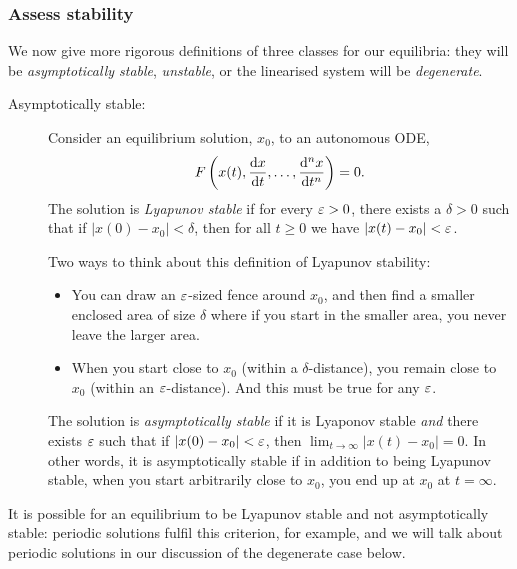 \documentclass[main.tex]{subfiles}
\begin{document}
\subsubsection*{\StepFour Assess stability}
We now give more rigorous definitions of three classes for our equilibria: they will be \emph{asymptotically stable}, \emph{unstable}, or the linearised system will be \emph{degenerate}.
\begin{description}
	\item[Asymptotically stable:]
    Consider an equilibrium solution, $x_0$, to an autonomous ODE,
    \begin{equation}
    \label{nonlin}
    F\left(x(t),\fd{x}{t},\dots,\fdn{n}{x}{t}\right) = 0.
    \end{equation}
    The solution is \emph{Lyapunov stable} if for every $\varepsilon > 0$, there exists a $\delta > 0$ such that if $\vert x(0)-x_0\vert<\delta$, then for all $t \geq 0$ we have $\vert x(t)-x_0\vert<\varepsilon$. 
    
    Two ways to think about this definition of Lyapunov stability:
    \begin{itemize}
    	\item You can draw an $\varepsilon$-sized fence around $x_0$, and then find a smaller enclosed area of size $\delta$ where if you start in the smaller area, you never leave the larger area.
    	\item When you start close to $x_0$ (within a $\delta$-distance), you remain close to $x_0$ (within an $\varepsilon$-distance). And this must be true for any $\varepsilon$.
	\end{itemize}
    
    The solution is \emph{asymptotically stable} if it is Lyaponov stable \emph{and} there exists $\varepsilon$ such that if $\vert x(0)-x_0\vert<\varepsilon$, then  $\lim_{t\to \infty}\vert x(t)-x_0\vert=0$. In other words, it is asymptotically stable if in addition to being Lyapunov stable, when you start arbitrarily close to $x_0$, you end up at $x_0$ at $t=\infty$.
\end{description}

It is possible for an equilibrium to be Lyapunov stable and not asymptotically stable: periodic solutions fulfil this criterion, for example, and we will talk about periodic solutions in our discussion of the degenerate case below.
\end{document}
